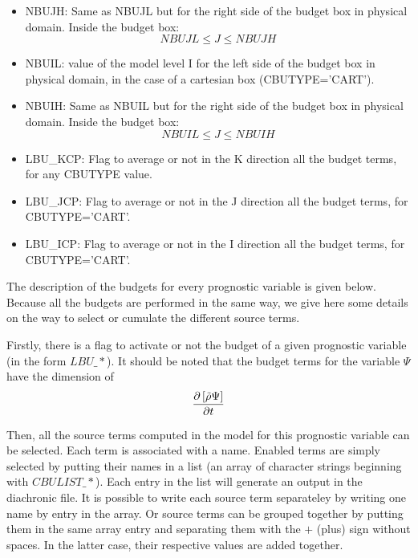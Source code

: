 \begin{itemize}
\item
{}
NBUJH: Same as NBUJL but for the right side of the budget box in physical domain.
 Inside the budget box:
$$ NBUJL \leq J \leq NBUJH $$

\item
{}
NBUIL: value of the model level I for the left side of the budget box in physical domain, in the case
of a cartesian box (CBUTYPE='CART').

\item
{}
NBUIH: Same as NBUIL but for the right side of the budget box in physical domain. Inside the budget box:
$$ NBUIL \leq J \leq NBUIH $$

\item
{}
LBU\_KCP: Flag to average or not in the K direction all the budget
terms, for any CBUTYPE value.

\item
{}
LBU\_JCP: Flag to average or not in the J direction all the budget
terms, for CBUTYPE='CART'.


\item
{}
LBU\_ICP: Flag to average or not in the I direction all the budget
terms, for CBUTYPE='CART'.

\end{itemize}

The description of the budgets for every prognostic variable is given below. Because all the budgets are performed in the same way, 
 we give here some details on the way to select or cumulate the different 
source terms.

Firstly, there is a flag to activate or not the budget of a given prognostic
variable (in the form $LBU\_*$). It should be noted that the budget terms for the variable $\Psi$
have the dimension of  
$$ {\partial \left[ \tilde{ \rho} \Psi \right] \over \partial t }$$   

Then, all the source terms computed in the model for this prognostic variable can be selected. Each term is associated with a name. Enabled terms are simply selected by putting their names in a list (an array of character strings beginning with $CBULIST\_*$). Each entry in the list will generate an output in the diachronic file. It is possible to write each source term separateley by writing one name by entry in the array. Or source terms can be grouped together by  putting them in the same array entry and separating them with the $+$ (plus) sign without spaces. In the latter case, their respective values are added together.

